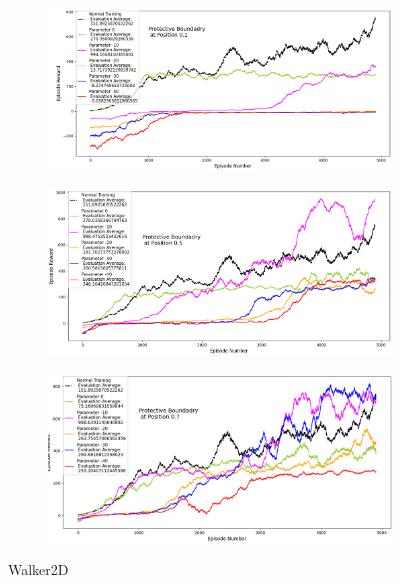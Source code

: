 \documentclass[journal]{IEEEtran}
\begin{document}
\begin{figure}
    \centering
    \begin{subfigure}[b]{0.5\textwidth}
      \centering
      \includegraphics[width=\textwidth]{Walker_with_Boundary_at_0.1.png}
    \end{subfigure}
    \vspace*{0.0mm}
    \begin{subfigure}[b]{0.5\textwidth}
      \centering
      \includegraphics[width=\textwidth]{Walker_with_Boundary_at_0.5.png}
    \end{subfigure}
    \vspace*{0.0mm}
    \begin{subfigure}[b]{0.5\textwidth}
      \centering
      \includegraphics[width=\textwidth]{Walker_with_Boundary_at_0.7.png}
    \end{subfigure}
    \caption{Walker2D}
    \label{fig:Walker}
\end{figure}
\end{document}
